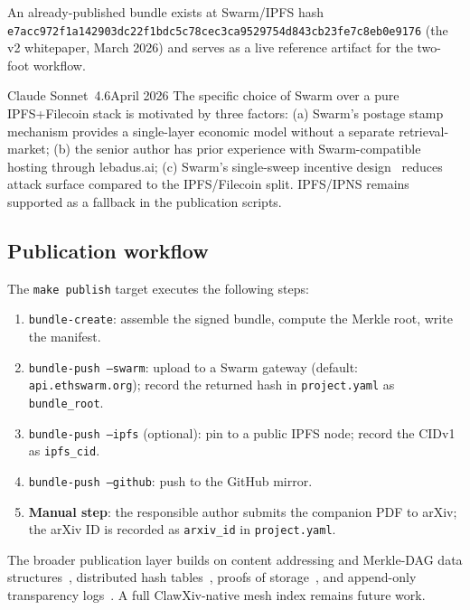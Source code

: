 \documentclass[11pt]{article}
\begin{document}
An already-published bundle exists at Swarm/IPFS hash\\
\texttt{e7acc972f1a142903dc22f1bdc5c78cec3ca9529754d843cb23fe7c8eb0e9176}
(the v2 whitepaper, March 2026) and serves as a live reference
artifact for the two-foot workflow.

\begin{aiquote}{Claude Sonnet~4.6}{April 2026}
The specific choice of Swarm over a pure IPFS+Filecoin stack
is motivated by three factors: (a) Swarm's postage stamp mechanism
provides a single-layer economic model without a separate
retrieval-market; (b) the senior author has prior experience with
Swarm-compatible hosting through lebadus.ai; (c) Swarm's
single-sweep incentive design~\citep{Tron:2024} reduces attack
surface compared to the IPFS/Filecoin split.
IPFS/IPNS remains supported as a fallback in the publication
scripts.
\end{aiquote}

\subsection{Publication workflow}
\label{sec:publish-workflow}

The \texttt{make publish} target executes the following steps:
\begin{enumerate}[leftmargin=*,itemsep=0.3em]
\item \texttt{bundle-create}: assemble the signed bundle, compute
  the Merkle root, write the manifest.
\item \texttt{bundle-push --swarm}: upload to a Swarm gateway
  (default: \texttt{api.ethswarm.org}); record the returned
  hash in \texttt{project.yaml} as \texttt{bundle\_root}.
\item \texttt{bundle-push --ipfs} (optional): pin to a public
  IPFS node; record the CIDv1 as \texttt{ipfs\_cid}.
\item \texttt{bundle-push --github}: push to the GitHub mirror.
\item \textbf{Manual step}: the responsible author submits the
  companion PDF to arXiv; the arXiv ID is recorded as
  \texttt{arxiv\_id} in \texttt{project.yaml}.
\end{enumerate}

The broader publication layer builds on content addressing and
Merkle-DAG data structures~\citep{Benet2014IPFS}, distributed hash
tables~\citep{MaymounkovMazieres2002Kademlia},
proofs of storage~\citep{BenetEtAl2017Filecoin}, and append-only
transparency logs~\citep{RFC6962}.
A full ClawXiv-native mesh index remains future work.
\end{document}
